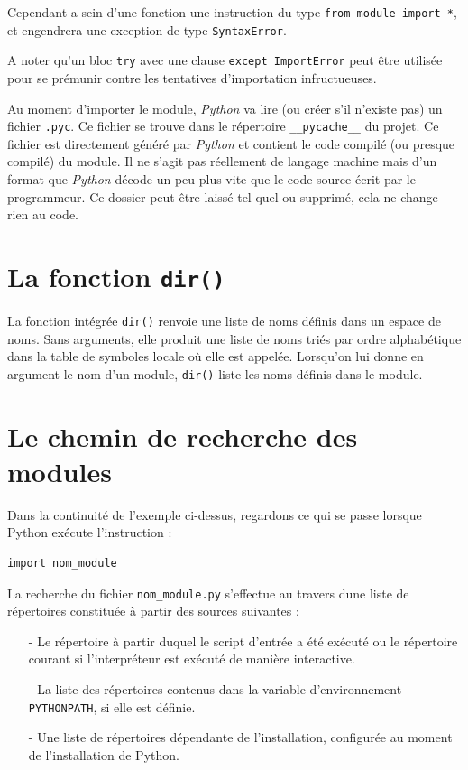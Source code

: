 \documentclass[a4paper,12pt]{book}
\begin{document}
Cependant a sein d'une fonction une instruction du type \texttt{from module import *}, et engendrera une exception de type \texttt{SyntaxError}.
\medskip

A noter qu'un bloc \texttt{try} avec une clause \texttt{except ImportError} peut être utilisée pour se prémunir contre les tentatives d'importation infructueuses.
\medskip

Au moment d'importer le module, \textit{Python} va lire (ou créer s'il n'existe pas) un fichier \texttt{.pyc}. Ce fichier se trouve dans le répertoire \texttt{\_\_pycache\_\_} du projet. Ce fichier est directement généré par \textit{Python} et contient le code compilé (ou presque compilé) du module. Il ne s'agit pas réellement de langage machine mais d'un format que \textit{Python} décode un peu plus vite que le code source écrit par le programmeur. Ce dossier peut-être laissé tel quel ou supprimé, cela ne change rien au code.
\medskip

\section{La fonction \texttt{dir()}}
La fonction intégrée \texttt{dir()} renvoie une liste de noms définis dans un espace de noms. Sans arguments, elle produit une liste de noms triés par ordre alphabétique dans la table de symboles locale où elle est appelée. Lorsqu'on lui donne en argument le nom d'un module, \texttt{dir()} liste les noms définis dans le module.
\medskip

\section{Le chemin de recherche des modules}
Dans la continuité de l'exemple ci-dessus, regardons ce qui se passe lorsque Python exécute l'instruction :
\begin{lstlisting}[caption=Importation d'un module]
import nom_module
\end{lstlisting}
\medskip

La recherche du fichier \texttt{nom\_module.py} s'effectue au travers dune liste de répertoires constituée à partir des sources suivantes :
\begin{itemize}
	\item[-] Le répertoire à partir duquel le script d'entrée a été exécuté ou le répertoire courant si l'interpréteur est exécuté de manière interactive.
	\item[-] La liste des répertoires contenus dans la variable d'environnement \texttt{PYTHONPATH}, si elle est définie.
	\item[-] Une liste de répertoires dépendante de l'installation, configurée au moment de l'installation de Python.
\end{itemize}
\medskip
\end{document}
